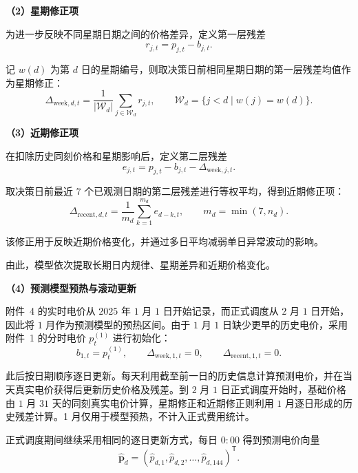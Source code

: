 \textbf{（2）星期修正项}

为进一步反映不同星期日期之间的价格差异，定义第一层残差
\begin{equation}
r_{j,t}
=
p_{j,t}-b_{j,t}.
\label{eq:q4_price_residual_week}
\end{equation}

记 $w(d)$ 为第 $d$ 日的星期编号，则取决策日前相同星期日期的第一层残差均值作为星期修正：
\begin{equation}
\Delta_{\mathrm{week},d,t}
=
\frac{1}{|\mathcal W_d|}
\sum_{j\in\mathcal W_d}r_{j,t},
\qquad
\mathcal W_d=\{j<d\mid w(j)=w(d)\}.
\label{eq:q4_week_correction}
\end{equation}

\textbf{（3）近期修正项}

在扣除历史同刻价格和星期影响后，定义第二层残差
\begin{equation}
e_{j,t}
=
p_{j,t}
-
b_{j,t}
-
\Delta_{\mathrm{week},j,t}.
\label{eq:q4_price_residual_recent}
\end{equation}

取决策日前最近 $7$ 个已观测日期的第二层残差进行等权平均，得到近期修正项：
\begin{equation}
\Delta_{\mathrm{recent},d,t}
=
\frac{1}{m_d}
\sum_{k=1}^{m_d}e_{d-k,t},
\qquad
m_d=\min(7,n_d).
\label{eq:q4_recent_correction}
\end{equation}

该修正用于反映近期价格变化，并通过多日平均减弱单日异常波动的影响。

由此，模型依次提取长期日内规律、星期差异和近期价格变化。

\textbf{（4）预测模型预热与滚动更新}

附件~4 的实时电价从 $2025$ 年 $1$ 月 $1$ 日开始记录，而正式调度从 $2$ 月 $1$ 日开始，因此将 $1$ 月作为预测模型的预热区间。由于 $1$ 月 $1$ 日缺少更早的历史电价，采用附件~1 的分时电价 $p_t^{(1)}$ 进行初始化：
\begin{equation}
b_{1,t}=p_t^{(1)},\qquad
\Delta_{\mathrm{week},1,t}=0,\qquad
\Delta_{\mathrm{recent},1,t}=0.
\label{eq:q4_price_cold_start}
\end{equation}

此后按日期顺序逐日更新。每天利用截至前一日的历史信息计算预测电价，并在当天真实电价获得后更新历史价格及残差。到 $2$ 月 $1$ 日正式调度开始时，基础价格由 $1$ 月 $31$ 天的同刻真实电价计算，星期修正和近期修正则利用 $1$ 月逐日形成的历史残差计算。1 月仅用于模型预热，不计入正式费用统计。

正式调度期间继续采用相同的逐日更新方式，每日 $0{:}00$ 得到预测电价向量
\begin{equation}
\hat{\boldsymbol p}_d
=
\left(
\hat p_{d,1},
\hat p_{d,2},
\ldots,
\hat p_{d,144}
\right)^{\mathsf T}.
\label{eq:q4_price_vector}
\end{equation}

